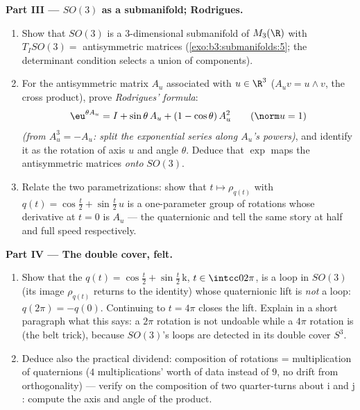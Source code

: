 \begin{problem}
\medskip
\noindent\textbf{Part III --- $SO(3)$ as a submanifold;
Rodrigues.}
\begin{enumerate}[resume]
  \item Show that $SO(3)$ is a  $3$-dimensional
        submanifold of $M_3(\R)$ with $T_ISO(3) =$
        antisymmetric matrices
        (\cref{exo:b3:submanifolds:5}; the determinant
        condition selects a union of components).
  \item For the antisymmetric matrix $A_u$ associated with
        $u \in \R^3$ ($A_uv = u\wedge v$, the cross
        product), prove \emph{Rodrigues' formula}:
        \[
        \eu^{\theta A_u} = I + \sin\theta\,A_u + (1 -
        \cos\theta)\,A_u^2 \qquad (\norm u = 1)
        \]
        \emph{(from $A_u^3 = -A_u$: split the exponential
        series along $A_u$'s powers)}, and identify it as the
        rotation of axis $u$ and angle $\theta$. Deduce that
        $\exp$ maps the antisymmetric matrices \emph{onto}
        $SO(3)$.
  \item Relate the two parametrizations: show that $t
        \mapsto \rho_{q(t)}$ with $q(t) = \cos\frac t2 +
        \sin\frac t2\,u$ is a one-parameter group of
        rotations whose derivative at $t = 0$ is $A_u$
        --- the quaternionic and  tell
        the same story at half and full speed respectively.
\end{enumerate}

\medskip
\noindent\textbf{Part IV --- The double cover, felt.}
\begin{enumerate}[resume]
  \item Show that the  $q(t) = \cos\frac t2 + \sin\frac
        t2\,\mathrm k$, $t \in \intcc0{2\pi}$, is a loop in
        $SO(3)$ (its image $\rho_{q(t)}$ returns to the
        identity) whose quaternionic lift is \emph{not} a
        loop: $q(2\pi) = -q(0)$. Continuing to $t = 4\pi$
        closes the lift. Explain in a short paragraph what
        this says: a $2\pi$ rotation is not 
        undoable while a $4\pi$ rotation is (the belt
        trick), because $SO(3)$'s loops are detected in its
        double cover $S^3$.
  \item Deduce also the practical dividend: composition of
        rotations = multiplication of quaternions
        ($4$ multiplications' worth of data instead of $9$,
        no drift from orthogonality) --- verify on the
        composition of two quarter-turns about $\mathrm i$
        and $\mathrm j$: compute the axis and angle of the
        product.
\end{enumerate}


\end{problem}
